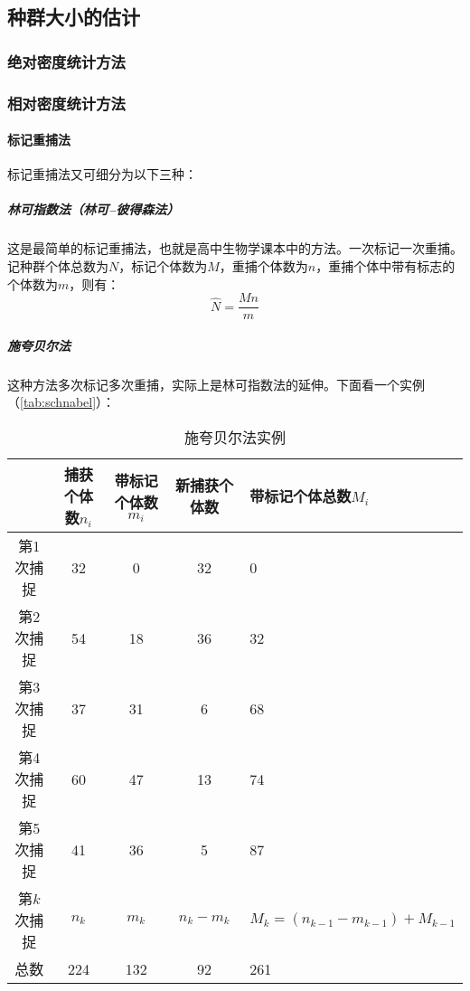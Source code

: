 \subsection{种群大小的估计}

\subsubsection{绝对密度统计方法}

\subsubsection{相对密度统计方法}

\paragraph{标记重捕法}

标记重捕法又可细分为以下三种：
\subparagraph{林可指数法（林可--彼得森法）}

这是最简单的标记重捕法，也就是高中生物学课本中的方法。一次标记一次重捕。记种群个体总数为$N$，标记个体数为$M$，重捕个体数为$n$，重捕个体中带有标志的个体数为$m$，则有：\[\hat{N}=\frac{Mn}{m}\]



\subparagraph{施夸贝尔法}

这种方法多次标记多次重捕，实际上是林可指数法的延伸。下面看一个实例（\autoref{tab:schnabel}）：

\begin{table}[htbp]
	\centering
	\begin{tabularx}{\textwidth}{|c|c|c|c|X|}
		\hline
		& 捕获个体数$n_{i}$ & 带标记个体数$m_{i}$ & 新捕获个体数 & 带标记个体总数$M_{i}$ \\ \hline
		第1次捕捉 & 32    & 0      & 32     & 0       \\ \hline
		第2次捕捉 & 54    & 18     & 36     & 32      \\ \hline
		第3次捕捉 & 37    & 31     & 6      & 68      \\ \hline
		第4次捕捉 & 60    & 47     & 13     & 74      \\ \hline
		第5次捕捉 & 41    & 36     & 5      & 87      \\ \hline
		第$k$次捕捉 & $n_{k}$    & $m_{k}$     & $n_{k}-m_{k}$      & $M_{k}=(n_{k-1}-m_{k-1})+M_{k-1}$      \\ \hline
		总数    & 224   & 132    & 92     & 261     \\ \hline
	\end{tabularx}
	\caption{施夸贝尔法实例}
	\label{tab:schnabel}
\end{table}

